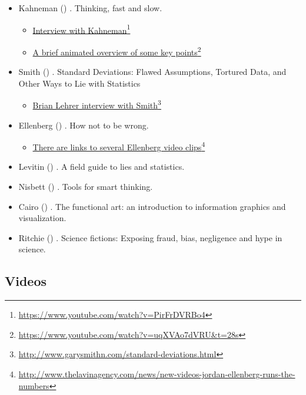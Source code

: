 \documentclass[
  10ptls,
  b5paper]{book}
\providecommand{\tightlist}{%
  \setlength{\itemsep}{0pt}\setlength{\parskip}{0pt}}
\begin{document}
\begin{itemize}
\tightlist
\item
  Kahneman () . Thinking, fast and slow.

  \begin{itemize}
  \tightlist
  \item
    \href{https://www.youtube.com/watch?v=PirFrDVRBo4}{Interview with Kahneman}\footnote{\url{https://www.youtube.com/watch?v=PirFrDVRBo4}}
  \item
    \href{https://www.youtube.com/watch?v=uqXVAo7dVRU&t=28s}{A brief animated overview of some key points}\footnote{\url{https://www.youtube.com/watch?v=uqXVAo7dVRU&t=28s}}
  \end{itemize}
\item
  Smith () . Standard Deviations: Flawed Assumptions, Tortured Data, and Other Ways to Lie with Statistics

  \begin{itemize}
  \tightlist
  \item
    \href{http://www.garysmithn.com/standard-deviations.html}{Brian Lehrer interview with Smith}\footnote{\url{http://www.garysmithn.com/standard-deviations.html}}
  \end{itemize}
\item
  Ellenberg () . How not to be wrong.

  \begin{itemize}
  \tightlist
  \item
    \href{http://www.thelavinagency.com/news/new-videos-jordan-ellenberg-runs-the-numbers}{There are links to several Ellenberg video clips}\footnote{\url{http://www.thelavinagency.com/news/new-videos-jordan-ellenberg-runs-the-numbers}}
  \end{itemize}
\item
  Levitin () . A field guide to lies and statistics.
\item
  Nisbett () . Tools for smart thinking.
\item
  Cairo () . The functional art: an introduction to information graphics and visualization.
\item
  Ritchie () . Science fictions: Exposing fraud, bias, negligence and hype in science.
\end{itemize}

\subsection*{Videos}\label{videos}
\end{document}
